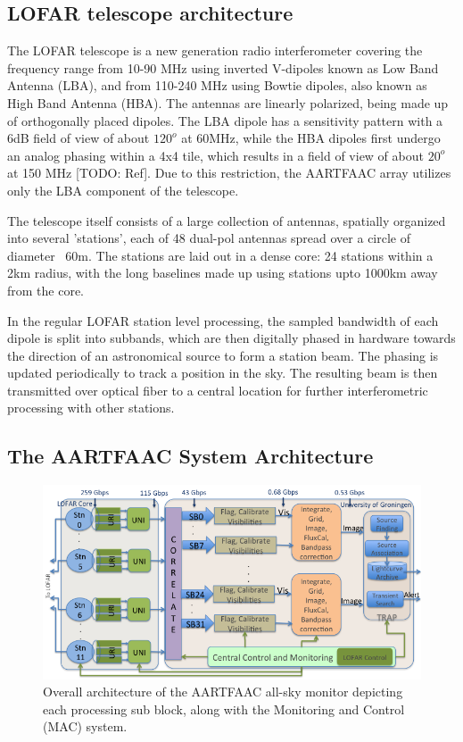 \documentclass{ws-jai}
\begin{document}
\subsection {\label{subsec:lofar} LOFAR telescope architecture}
The   LOFAR   telescope  \citep{van2013lofar}   is   a   new  generation   radio
interferometer  covering  the frequency  range  from  10-90 MHz  using  inverted
V-dipoles known  as Low Band  Antenna (LBA), and  from 110-240 MHz  using Bowtie
dipoles,  also known  as High  Band Antenna  (HBA).  The  antennas are  linearly
polarized, being made  up of orthogonally placed dipoles.  The  LBA dipole has a
sensitivity pattern with  a 6dB field of  view of about $120^o$  at 60MHz, while
the HBA dipoles first undergo an analog phasing within a 4x4 tile, which results
in  a field  of view  of  about $20^o$  at 150  MHz  [TODO: Ref].   Due to  this
restriction,  the  AARTFAAC  array  utilizes  only  the  LBA  component  of  the
telescope.

The  telescope itself  consists of  a  large collection  of antennas,  spatially
organized into  several 'stations', each of  48 dual-pol antennas spread  over a
circle of diameter ~60m.  The stations are laid out in a dense core: 24 stations
within a 2km radius, with the long  baselines made up using stations upto 1000km
away from the core.

In the  regular LOFAR station  level processing,  the sampled bandwidth  of each
dipole  is split  into subbands,  which are  then digitally  phased in  hardware
towards the  direction of  an astronomical  source to form  a station  beam. The
phasing is  updated periodically to track  a position in the  sky. The resulting
beam is  then transmitted over optical  fiber to a central  location for further
interferometric processing with other stations.

\subsection {\label{subsec:aartfaac}  The AARTFAAC System Architecture}
\begin{figure}[htbp]
\centering
\includegraphics[width=1\textwidth]{Figs/Overall_arch_afaac/Slide1.png}
\caption {Overall  architecture of the  AARTFAAC all-sky monitor  depicting each
  processing sub block, along with the Monitoring and Control (MAC) system. }
\label{fig:afaac_arch}
\end{figure}
\end{document}
